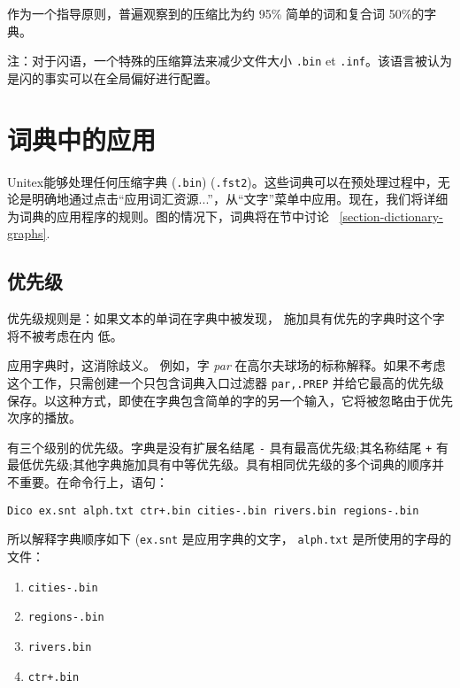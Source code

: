 \bigskip
\noindent 作为一个指导原则，普遍观察到的压缩比为约 95\%
简单的词和复合词 50\%的字典。


\bigskip
\noindent 注：对于闪语，一个特殊的压缩算法来减少文件大小 \verb+.bin+ et \verb+.inf+。该语言被认为是闪的事实可以在全局偏好进行配置。


\section{词典中的应用}
\label{section-applying-dictionaries}

\bigskip
\noindent Unitex能够处理任何压缩字典 (\verb+.bin+)  (\verb+.fst2+)。这些词典可以在预处理过程中，无论是明确地通过点击“应用词汇资源...”，从“文字”菜单中应用。现在，我们将详细为词典的应用程序的规则。图的情况下，词典将在节中讨论 ~\ref{section-dictionary-graphs}.

\subsection{优先级}
\label{section-dictionary-priorities}
优先级规则是：如果文本的单词在字典中被发现，
施加具有优先的字典时这个字将不被考虑在内
低。


\bigskip
\noindent 应用字典时，这消除歧义。
例如，字 \textit{par} 在高尔夫球场的标称解释。如果不考虑这个工作，只需创建一个只包含词典入口过滤器
\verb$par,.PREP$ 并给它最高的优先级保存。以这种方式，即使在字典包含简单的字的另一个输入，它将被忽略由于优先次序的播放。

\bigskip
\noindent 有三个级别的优先级。字典是没有扩展名结尾 \verb+-+\index{\verb+-+}\index{\verb$+$} 具有最高优先级;其名称结尾 \verb-+- 有最低优先级;其他字典施加具有中等优先级。具有相同优先级的多个词典的顺序并不重要。在命令行上，语句：


\bigskip
\noindent
\verb$Dico ex.snt alph.txt ctr+.bin cities-.bin rivers.bin regions-.bin$

\bigskip \noindent 所以解释字典顺序如下 (\verb+ex.snt+ 是应用字典的文字， \verb+alph.txt+ 是所使用的字母的文件：

\begin{enumerate}
  \item \verb$cities-.bin$
  \item \verb$regions-.bin$
  \item \verb$rivers.bin$
  \item \verb$ctr+.bin$
\end{enumerate}

